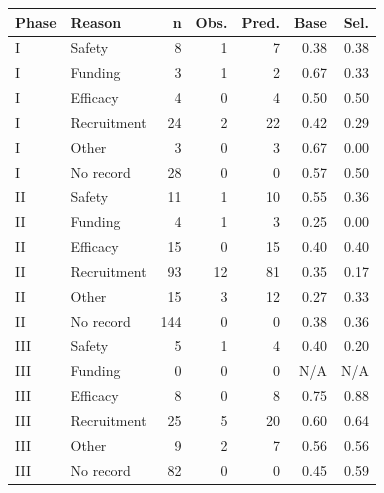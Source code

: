 \begin{tabular}{llrrrrr}
\toprule
Phase & Reason & n & Obs. & Pred. & Base & Sel. \\
\midrule
I & Safety & 8 & 1 & 7 & 0.38 & 0.38 \\
I & Funding & 3 & 1 & 2 & 0.67 & 0.33 \\
I & Efficacy & 4 & 0 & 4 & 0.50 & 0.50 \\
I & Recruitment & 24 & 2 & 22 & 0.42 & 0.29 \\
I & Other & 3 & 0 & 3 & 0.67 & 0.00 \\
I & No record & 28 & 0 & 0 & 0.57 & 0.50 \\
II & Safety & 11 & 1 & 10 & 0.55 & 0.36 \\
II & Funding & 4 & 1 & 3 & 0.25 & 0.00 \\
II & Efficacy & 15 & 0 & 15 & 0.40 & 0.40 \\
II & Recruitment & 93 & 12 & 81 & 0.35 & 0.17 \\
II & Other & 15 & 3 & 12 & 0.27 & 0.33 \\
II & No record & 144 & 0 & 0 & 0.38 & 0.36 \\
III & Safety & 5 & 1 & 4 & 0.40 & 0.20 \\
III & Funding & 0 & 0 & 0 & N/A & N/A \\
III & Efficacy & 8 & 0 & 8 & 0.75 & 0.88 \\
III & Recruitment & 25 & 5 & 20 & 0.60 & 0.64 \\
III & Other & 9 & 2 & 7 & 0.56 & 0.56 \\
III & No record & 82 & 0 & 0 & 0.45 & 0.59 \\
\bottomrule
\end{tabular}
